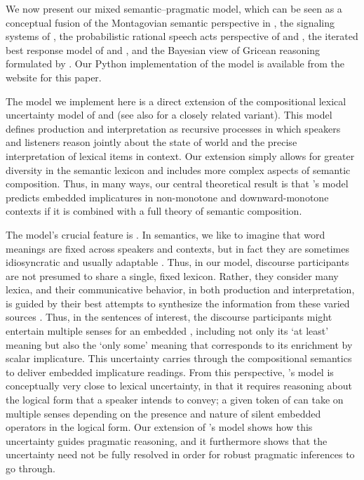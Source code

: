 \documentclass[leqno,12pt]{article}
\begin{document}
We now present our mixed semantic--pragmatic model, which can be seen
as a conceptual fusion of the Montagovian semantic perspective in
\citet{Lewis70GS}, the signaling systems of \citet{Lewis69}, the
probabilistic rational speech acts perspective of
\citet{Frank:Goodman:2012} and \citet{Goodman:Stuhlmuller:2013}, the
iterated best response model of \citet{Jaeger:2007,Jaeger:2011} and
\citet{Franke09DISS}, and the Bayesian view of Gricean reasoning
formulated by \citet{Russell:2012}.  Our Python implementation of the
model is available from the website for this paper.

The model we implement here is a direct extension of the compositional
lexical uncertainty model of \citet{Bergen:Goodman:Levy:2012} and
\citet{Bergen:Levy:Goodman:2014} (see also
\citealp{lassiter-goodman:2013SALT} for a closely related
variant). This model defines production and
interpretation as recursive processes in which speakers and listeners
reason jointly about the state of world and the precise interpretation
of lexical items in context.  Our extension simply allows for greater
diversity in the semantic lexicon and includes more complex aspects of
semantic composition. Thus, in many ways, our central theoretical
result is that \citeauthor{Bergen:Levy:Goodman:2014}'s model predicts
embedded implicatures in non-monotone and downward-monotone contexts
if it is combined with a full theory of semantic composition.


The model's crucial feature is .  In
semantics, we like to imagine that word meanings are fixed across
speakers and contexts, but in fact they are sometimes idiosyncratic
and usually adaptable \citep{Clark97}. Thus, in our model, discourse
participants are not presumed to share a single, fixed
lexicon. Rather, they consider many lexica, and their communicative
behavior, in both production and interpretation, is guided by their
best attempts to synthesize the information from these varied sources
\citep{Giles:Coupland:Coupland:1991}. Thus, in the sentences of
interest, the discourse participants might entertain multiple senses
for an embedded , including not only its `at least' meaning
but also the `only some' meaning that corresponds to its enrichment by
scalar implicature. This uncertainty carries through the compositional
semantics to deliver embedded implicature readings. From this
perspective, \citeauthor{ChierchiaFoxSpector08}'s model is
conceptually very close to lexical uncertainty, in that it requires
reasoning about the logical form that a speaker intends to convey; a
given token of  can take on multiple senses depending on
the presence and nature of silent embedded operators in the logical
form. Our extension of \citeauthor{Bergen:Levy:Goodman:2014}'s model
shows how this uncertainty guides pragmatic reasoning, and it
furthermore shows that the uncertainty need not be fully resolved in
order for robust pragmatic inferences to go through.
\end{document}
